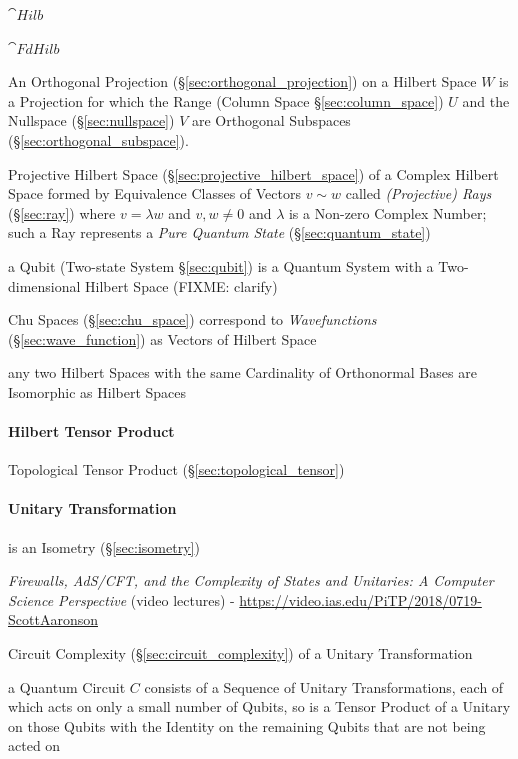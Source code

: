 $\cat{Hilb}$

$\cat{FdHilb}$

An Orthogonal Projection (\S\ref{sec:orthogonal_projection}) on a Hilbert Space
$W$ is a Projection for which the Range (Column Space \S\ref{sec:column_space})
$U$ and the Nullspace (\S\ref{sec:nullspace}) $V$ are Orthogonal Subspaces
(\S\ref{sec:orthogonal_subspace}).

\fist Projective Hilbert Space (\S\ref{sec:projective_hilbert_space}) of a
Complex Hilbert Space formed by Equivalence Classes of Vectors $v \sim w$ called
\emph{(Projective) Rays} (\S\ref{sec:ray}) where $v = \lambda w$ and $v, w \neq
0$ and $\lambda$ is a Non-zero Complex Number; such a Ray represents a
\emph{Pure Quantum State} (\S\ref{sec:quantum_state})

\fist a Qubit (Two-state System \S\ref{sec:qubit}) is a Quantum System with a
Two-dimensional Hilbert Space (FIXME: clarify)

\fist Chu Spaces (\S\ref{sec:chu_space}) correspond to \emph{Wavefunctions}
(\S\ref{sec:wave_function}) as Vectors of Hilbert Space

any two Hilbert Spaces with the same Cardinality of Orthonormal Bases are
Isomorphic as Hilbert Spaces



\paragraph{Hilbert Tensor Product}\label{sec:hilbert_tensor}\hfill

Topological Tensor Product (\S\ref{sec:topological_tensor})



\paragraph{Unitary Transformation}\label{sec:unitary_transformation}\hfill

is an Isometry (\S\ref{sec:isometry})

\emph{Firewalls, AdS/CFT, and the Complexity of States and Unitaries: A Computer
  Science Perspective}
(video lectures)
-
\url{https://video.ias.edu/PiTP/2018/0719-ScottAaronson}

Circuit Complexity (\S\ref{sec:circuit_complexity}) of a
Unitary Transformation

a Quantum Circuit $C$ consists of a Sequence of Unitary Transformations, each of
which acts on only a small number of Qubits, so is a Tensor Product of a Unitary
on those Qubits with the Identity on the remaining Qubits that are not being
acted on



